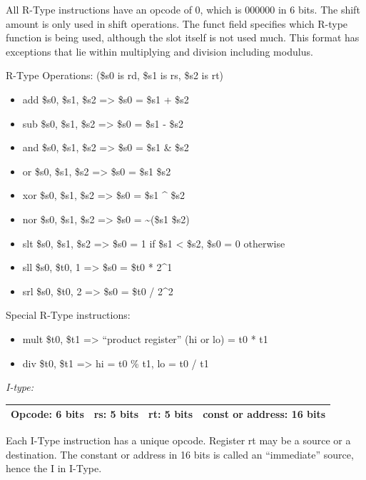 \documentclass[
    paper=letter,
    parskip=half,
    fontsize=12pt,
    titlepage=firstiscover,
    toc=bibliography,
    numbers=endperiod
]{scrartcl}
\providecommand{\tightlist}{%
  \setlength{\itemsep}{0pt}\setlength{\parskip}{0pt}}
\begin{document}
All R-Type instructions have an opcode of 0, which is 000000 in 6 bits.
The shift amount is only used in shift operations. The funct field
specifies which R-type function is being used, although the slot itself
is not used much. This format has exceptions that lie within multiplying
and division including modulus.

R-Type Operations: (\$s0 is rd, \$s1 is rs, \$s2 is rt)

\begin{itemize}
    \tightlist
    \item add \$s0, \$s1, \$s2 =\textgreater{} \$s0 = \$s1 + \$s2
    \item sub \$s0, \$s1, \$s2 =\textgreater{} \$s0 = \$s1 - \$s2
    \item and \$s0, \$s1, \$s2 =\textgreater{} \$s0 = \$s1 \& \$s2
    \item or \$s0, \$s1, \$s2 =\textgreater{} \$s0 = \$s1 \textbar{} \$s2
    \item xor \$s0, \$s1, \$s2 =\textgreater{} \$s0 = \$s1 \^{} \$s2
    \item nor \$s0, \$s1, \$s2 =\textgreater{} \$s0 = \textasciitilde(\$s1 \textbar{} \$s2)
    \item slt \$s0, \$s1, \$s2 =\textgreater{} \$s0 = 1 if \$s1 \textless{} \$s2, \$s0 = 0 otherwise
    \item sll \$s0, \$t0, 1 =\textgreater{} \$s0 = \$t0 * 2\^{}1 \item srl \$s0, \$t0, 2 =\textgreater{} \$s0 = \$t0 / 2\^{}2
\end{itemize}

Special R-Type instructions:

\begin{itemize}
    \tightlist
    \item mult \$t0, \$t1 =\textgreater{} ``product register'' (hi or lo) = t0 * t1
    \item div \$t0, \$t1 =\textgreater{} hi = t0 \% t1, lo = t0 / t1
\end{itemize}

\emph{I-type:}

\begin{tabularx}{\textwidth}{|c|c|c|C|}
    \hline
    Opcode: 6 bits & rs: 5 bits & rt: 5 bits & const or address: 16 bits \\
    \hline
\end{tabularx}

Each I-Type instruction has a unique opcode. Register rt may be a source
or a destination. The constant or address in 16 bits is called an
``immediate'' source, hence the I in I-Type.
\end{document}
